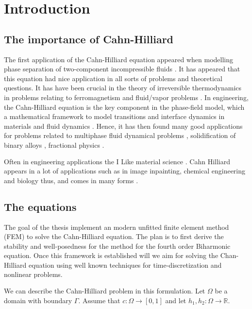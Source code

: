 \section{Introduction}\label{sec:introduction}

\subsection{The importance of Cahn-Hilliard}%
\label{sub:the_importance_of_cahn_hilliard}

The first application of the Cahn-Hilliard equation appeared when modelling phase separation of two-component incompressible fluids \cite{cahn1958free, cahn1959free}. It has appeared that this equation had nice application in all sorts of problems
and theoretical questions. It has have been crucial in the theory of irreversible thermodynamics in problems relating to ferromagnetism and fluid/vapor problems \cite{falk1992cahn}. In engineering, the Cahn-Hilliard equation is the key component in
the phase-field model, which a mathematical framework to model transitions and interface dynamics in materials and fluid dynamics \cite{steinbach2009phase}. Hence, it has then found many good applications for problems related to multiphase fluid
dynamical problems \cite{badalassi2003computation, li2016lattice, kim2012phase, shen2010phase}, solidification of binary alloys \cite{kim1999phase, echebarria2004quantitative}, fractional physics .

Often in engineering applications the
I Like material science \cite{chen2002phase}.
Cahn Hilliard appears in a lot of applications such as in image inpainting, chemical engineering and biology \cite{bressloff2014stochastic} thus, and comes in many forms \cite{miranville2017cahn}.

\subsection{The equations}%
\label{sub:the_equations}


The goal of the thesis implement an modern unfitted finite element method (FEM) to solve the Cahn-Hilliard equation. The plan is to first derive the stability and well-posedness for the method for the fourth order Biharmonic equation. Once this framework is established will we aim for solving the Chan-Hilliard equation using well known techniques for time-discretization and nonlinear problems.

We can describe the Cahn-Hilliard problem in this formulation. Let $\Omega  $ be a domain with boundary $\Gamma $. Assume that $c: \Omega  \to \left[ 0,1 \right] $ and let $h_{1},h_{2}:\Omega  \to \mathbb{R} $.


